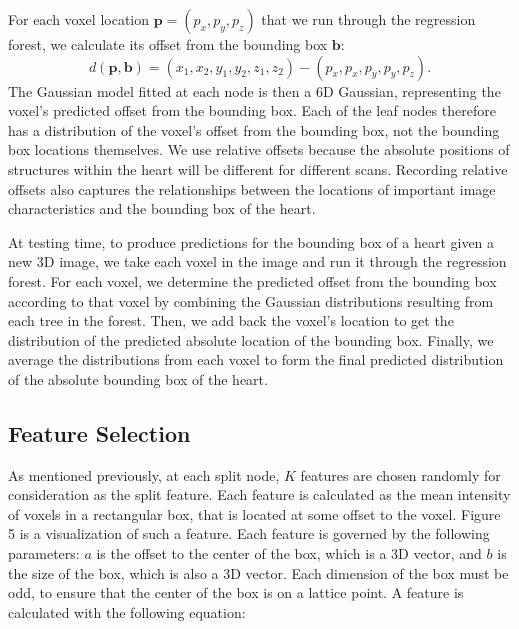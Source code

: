 For each voxel location $\mathbf{p}=(p_x, p_y, p_z)$ that we run through the regression forest, we calculate its offset from the bounding box $\mathbf{b}$:
\begin{equation}
  d(\mathbf{p}, \mathbf{b}) = (x_1, x_2, y_1, y_2, z_1, z_2) - (p_x, p_x, p_y, p_y, p_z).
\end{equation}
The Gaussian model fitted at each node is then a 6D Gaussian, representing the voxel's predicted offset from the bounding box. Each of the leaf nodes therefore has a distribution of the voxel's offset from the bounding box, not the bounding box locations themselves. We use relative offsets because the absolute positions of structures within the heart will be different for different scans. Recording relative offsets also captures the relationships between the locations of important image characteristics and the bounding box of the heart.

At testing time, to produce predictions for the bounding box of a heart given a new 3D image, we take each voxel in the image and run it through the regression forest. For each voxel, we determine the predicted offset from the bounding box according to that voxel by combining the Gaussian distributions resulting from each tree in the forest. Then, we add back the voxel's location to get the distribution of the predicted absolute location of the bounding box. Finally, we average the distributions from each voxel to form the final predicted distribution of the absolute bounding box of the heart.

\subsection{Feature Selection}
As mentioned previously, at each split node, $K$ features are chosen randomly for consideration as the split feature. Each feature is calculated as the mean intensity of voxels in a rectangular box, that is located at some offset to the voxel. Figure 5 is a visualization of such a feature. Each feature is governed by the following parameters: $a$ is the offset to the center of the box, which is a 3D vector, and $b$ is the size of the box, which is also a 3D vector. Each dimension of the box must be odd, to ensure that the center of the box is on a lattice point. A feature is calculated with the following equation:

